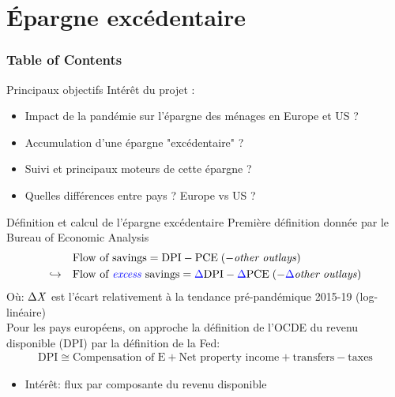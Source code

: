 \documentclass[9pt, xcolor={dvipsnames}]{beamer}
\newcommand{\blue}[1]{\textcolor{blue}{#1}}
\begin{document}
\section{Épargne excédentaire}
\begin{frame}
  \frametitle{Table of Contents}
  \tableofcontents[currentsection]
\end{frame}
\begin{frame}{Principaux objectifs}
  Intérêt du projet :
  \begin{itemize}
    \item Impact de la pandémie sur l'épargne des ménages en Europe et US ? 
    \item Accumulation d'une épargne "excédentaire" ? 
    \item Suivi et principaux moteurs de cette épargne ? 
    \item Quelles différences entre pays ? Europe vs US ?
  \end{itemize}
\end{frame}

\begin{frame}{Définition et calcul de l'épargne excédentaire}
  Première définition donnée par le Bureau of Economic Analysis
  \begin{align*}
    &\textrm{Flow of savings} = \textrm{DPI} - \textrm{PCE} \; (- \textrm{\textit{other outlays}}) \\
    \hookrightarrow \quad &\textrm{Flow of \blue{\textit{excess}} savings} = \blue{\Delta} \textrm{DPI} - \blue{\Delta} \textrm{PCE} \; (- \blue{\Delta} \textrm{\textit{other outlays}})
  \end{align*}
  Où: $\Delta \textrm{\textit{X}}$ est l'écart relativement à la tendance pré-pandémique 2015-19 (log-linéaire) \\ 
  \vspace{.3cm}
  Pour les pays européens, on approche la définition de l'OCDE du revenu disponible (DPI) par la définition de la Fed:
  \begin{align*}
    \textrm{DPI} \cong  \textrm{Compensation of E} + \textrm{Net property income} + \textrm{transfers} - \textrm{taxes}
  \end{align*}
  \begin{itemize}
    \item Intérêt: flux par composante du revenu disponible
  \end{itemize}
\end{frame}
\end{document}
